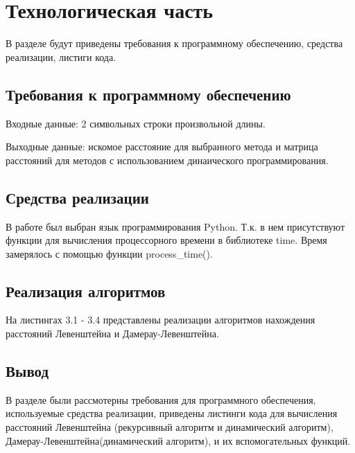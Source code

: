 \chapter{Технологическая часть}
В разделе будут приведены требования к программному обеспечению, средства реализации, листиги кода.
\section{Требования к программному обеспечению}
Входные данные: 2 символьных строки произвольной длины.

Выходные данные: искомое расстояние для выбранного метода и матрица расстояний для методов с использованием динаического программирования.

\section{Средства реализации}
В работе был выбран язык программирования Python\cite{python}. Т.к. в нем присутствуют функции для вычисления процессорного времени в библиотеке time\cite{python-time}. Время замерялось с помощью функции process\_time().

\section{Реализация алгоритмов}
На листингах 3.1 - 3.4 представлены реализации алгоритмов нахождения расстояний Левенштейна и Дамерау-Левенштейна.

\newpage
\newpage
\newpage
\newpage
\section*{Вывод}
В разделе были рассмотерны требования для программного обеспечения, используемые средства реализации, приведены листинги кода для вычисления расстояний Левенштейна (рекурсивный алгоритм и динамический алгоритм), Дамерау-Левенштейна(динамический алгоритм), и их вспомогательных функций.